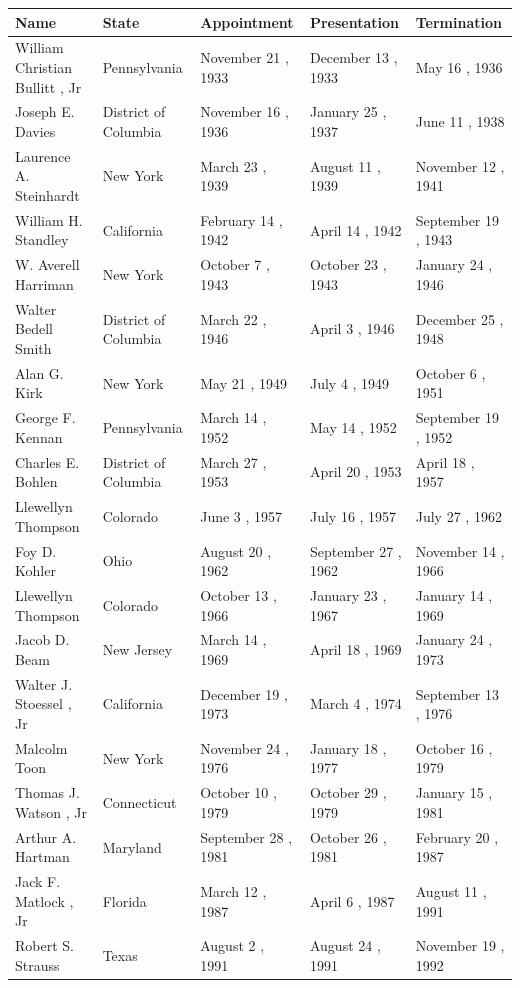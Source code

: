 \documentclass{article}
\begin{document}
\begin{tabular}{lllll}
\toprule
Name & State & Appointment & Presentation & Termination \\
\midrule
William Christian Bullitt , Jr & Pennsylvania & November 21 , 1933 & December 13 , 1933 & May 16 , 1936 \\
Joseph E. Davies & District of Columbia & November 16 , 1936 & January 25 , 1937 & June 11 , 1938 \\
Laurence A. Steinhardt & New York & March 23 , 1939 & August 11 , 1939 & November 12 , 1941 \\
William H. Standley & California & February 14 , 1942 & April 14 , 1942 & September 19 , 1943 \\
W. Averell Harriman & New York & October 7 , 1943 & October 23 , 1943 & January 24 , 1946 \\
Walter Bedell Smith & District of Columbia & March 22 , 1946 & April 3 , 1946 & December 25 , 1948 \\
Alan G. Kirk & New York & May 21 , 1949 & July 4 , 1949 & October 6 , 1951 \\
George F. Kennan & Pennsylvania & March 14 , 1952 & May 14 , 1952 & September 19 , 1952 \\
Charles E. Bohlen & District of Columbia & March 27 , 1953 & April 20 , 1953 & April 18 , 1957 \\
Llewellyn Thompson & Colorado & June 3 , 1957 & July 16 , 1957 & July 27 , 1962 \\
Foy D. Kohler & Ohio & August 20 , 1962 & September 27 , 1962 & November 14 , 1966 \\
Llewellyn Thompson & Colorado & October 13 , 1966 & January 23 , 1967 & January 14 , 1969 \\
Jacob D. Beam & New Jersey & March 14 , 1969 & April 18 , 1969 & January 24 , 1973 \\
Walter J. Stoessel , Jr & California & December 19 , 1973 & March 4 , 1974 & September 13 , 1976 \\
Malcolm Toon & New York & November 24 , 1976 & January 18 , 1977 & October 16 , 1979 \\
Thomas J. Watson , Jr & Connecticut & October 10 , 1979 & October 29 , 1979 & January 15 , 1981 \\
Arthur A. Hartman & Maryland & September 28 , 1981 & October 26 , 1981 & February 20 , 1987 \\
Jack F. Matlock , Jr & Florida & March 12 , 1987 & April 6 , 1987 & August 11 , 1991 \\
Robert S. Strauss & Texas & August 2 , 1991 & August 24 , 1991 & November 19 , 1992 \\
\bottomrule
\end{tabular}
\end{document}
